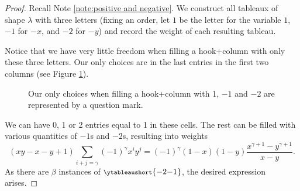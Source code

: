 \documentclass[twoside]{article}
\begin{document}
\begin{proof} Recall Note \ref{note:positive and negative}. We construct all tableaux of shape $\lambda$ with three letters (fixing an order, let $1$ be the letter for the variable $1$, $-1$ for $-x$, and $-2$ for $-y$) and record the weight of each resulting tableau.

Notice that we have very little freedom when filling a hook+column with only these three letters. Our only choices are in the last entries in the first two columns (see Figure \ref{fig:slambda en 1-x-y}).
\begin{figure}[H]
    \centering
    \ytableaubig
    \footnotesize
    \caption{Our only choices when filling a hook+column with 1, $-1$ and $-2$ are represented by a question mark.}
    \label{fig:slambda en 1-x-y}
\end{figure}

We can have 0, 1 or 2 entries equal to 1 in these cells. The rest can be filled with various quantities of $-1$s and $-2$s, resulting into weights
\[(xy - x - y + 1)\sum_{i+j=\gamma}(-1)^\gamma x^iy^j = (-1)^\gamma (1-x)(1-y)\frac{x^{\gamma+1}-y^{\gamma+1}}{x-y}.\]
As there are $\beta$ instances of \ytableaubig${
    \footnotesize\ytableaushort{{-2}{-1}}}$, the desired expression arises.
\end{proof}
\end{document}
